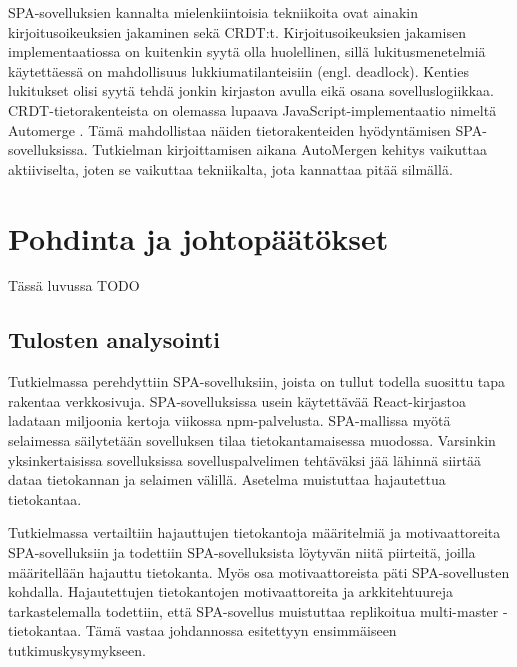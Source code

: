 \documentclass[finnish,twoside,censored,csm,sw-track-2018]{HYthesisML}
\begin{document}
SPA-sovelluksien kannalta mielenkiintoisia tekniikoita ovat ainakin kirjoitusoikeuksien jakaminen sekä CRDT:t. Kirjoitusoikeuksien jakamisen implementaatiossa on kuitenkin syytä olla huolellinen, sillä lukitusmenetelmiä käytettäessä on mahdollisuus lukkiumatilanteisiin (engl. deadlock). Kenties lukitukset olisi syytä tehdä jonkin kirjaston avulla eikä osana sovelluslogiikkaa. CRDT-tietorakenteista on olemassa lupaava JavaScript-implementaatio nimeltä Automerge \cite{automerge}. Tämä mahdollistaa näiden tietorakenteiden hyö\-dyntämisen SPA-sovelluksissa. Tutkielman kirjoittamisen aikana AutoMergen kehitys vaikuttaa aktiiviselta, joten se vaikuttaa tekniikalta, jota kannattaa pitää silmällä.

\chapter{Pohdinta ja johtopäätökset}

Tässä luvussa TODO

\section{Tulosten analysointi}

Tutkielmassa perehdyttiin SPA-sovelluksiin, joista on tullut todella suosittu tapa rakentaa verkkosivuja. SPA-sovelluksissa usein käytettävää React-kirjastoa ladataan miljoonia kertoja viikossa npm-palvelusta. SPA-mallissa myötä selaimessa säilytetään sovelluksen tilaa tietokantamaisessa muodossa. Varsinkin yksinkertaisissa sovelluksissa sovelluspalvelimen tehtäväksi jää lähinnä siirtää dataa tietokannan ja selaimen välillä. Asetelma muistuttaa hajautettua tietokantaa.

Tutkielmassa vertailtiin hajauttujen tietokantoja määritelmiä ja motivaattoreita SPA-sovelluksiin ja todettiin SPA-sovelluksista löytyvän niitä piirteitä, joilla määritellään hajauttu tietokanta. Myös osa motivaattoreista päti SPA-sovellusten kohdalla. Hajautettujen tietokantojen motivaattoreita ja arkkitehtuureja tarkastelemalla todettiin, että SPA-sovellus muistuttaa replikoitua multi-master -tietokantaa. Tämä vastaa johdannossa esitettyyn ensimmäiseen tutkimuskysymykseen.
\end{document}
